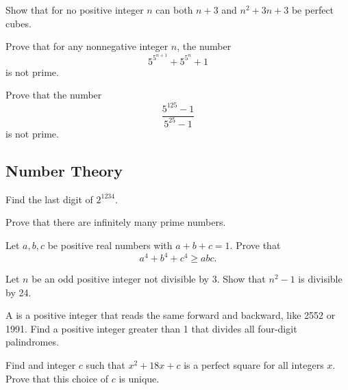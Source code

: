 \documentclass[12pt]{article}
\begin{document}
        \begin{exercise}
            Show that for no positive integer $n$ can both $n+3$ and $n^2+3n+3$ be perfect cubes.
        \end{exercise}
            
        \begin{exercise}
            Prove that for any nonnegative integer $n$, the number
            \[5^{5^{n+1}}+5^{5^n} +1\] is not prime.
        \end{exercise}
            
        \begin{exercise}
            Prove that the number
            \[\frac{5^{125}-1}{5^{25}-1}\]
            is not prime.
        \end{exercise}

    \subsection{Number Theory}

        \begin{exercise}
            Find the last digit of \(2^{1234}\).
        \end{exercise}

        \begin{exercise}
            Prove that there are infinitely  many prime numbers.
        \end{exercise}

        \begin{exercise}
            Let \(a,b,c\) be positive real numbers with \(a+b+c=1\). Prove that
            \[a^4 + b^4 + c^4 \geq abc.\]
        \end{exercise}
    
        \begin{exercise}
            Let \(n\) be an odd positive integer not divisible by 3. Show that \(n^2-1\) is divisible by 24.
        \end{exercise}
    
        \begin{exercise}
            A  is a positive integer that reads the same forward and backward, like 2552 or 1991. 
            Find a positive integer greater than 1 that divides all four-digit palindromes.
        \end{exercise}
    
        \begin{exercise}
            Find and integer \(c\) such that \(x^2+18x+c\) is a perfect square for all integers \(x\). 
            Prove that this choice of \(c\) is unique. 
        \end{exercise}
    
\end{document}
